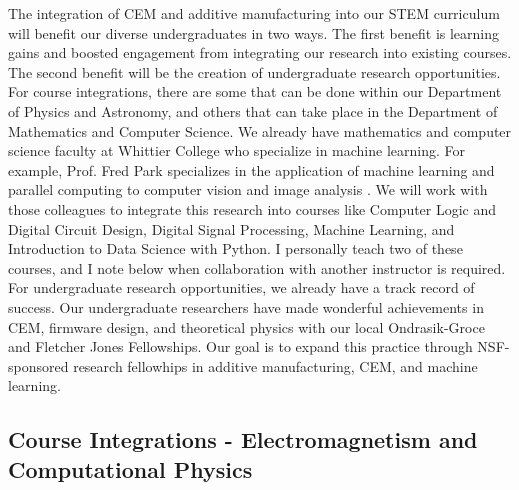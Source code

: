 \documentclass[../../main.tex]{subfiles}
\begin{document}
The integration of CEM and additive manufacturing into our STEM curriculum will benefit our diverse undergraduates in two ways.  The first benefit is learning gains and boosted engagement from integrating our research into existing courses.  The second benefit will be the creation of undergraduate research opportunities.  For course integrations, there are some that can be done within our Department of Physics and Astronomy, and others that can take place in the Department of Mathematics and Computer Science.  We already have mathematics and computer science faculty at Whittier College who specialize in machine learning.  For example, Prof. Fred Park specializes in the application of machine learning and parallel computing to computer vision and image analysis \cite{SHI201528,doi:10.1137/20M1337041}.  We will work with those colleagues to integrate this research into courses like Computer Logic and Digital Circuit Design, Digital Signal Processing, Machine Learning, and Introduction to Data Science with Python.  I personally teach two of these courses, and I note below when collaboration with another instructor is required.  For undergraduate research opportunities, we already have a track record of success.  Our undergraduate researchers have made wonderful achievements in CEM, firmware design, and theoretical physics with our local Ondrasik-Groce and Fletcher Jones Fellowships.  Our goal is to expand this practice through NSF-sponsored research fellowhips in additive manufacturing, CEM, and machine learning.\\ \vspace{2.5mm}


\subsection{Course Integrations - Electromagnetism and Computational Physics}
\end{document}
